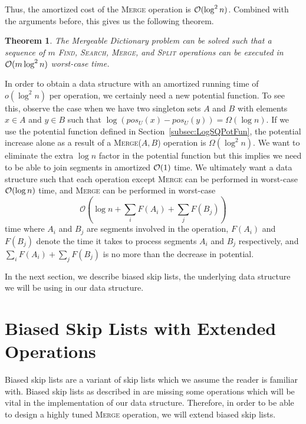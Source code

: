 \documentclass[11pt]{article}
\newcommand{\prob}{Mergeable Dictionary}
\newcommand{\kwMs}{Make-Set}
\newcommand{\kwSpl}{Split}
\newcommand{\kwUnion}{Merge}
\newcommand{\kwSrc}{Search}
\newcommand{\kwFind}{Find}
\newcommand{\Ms}{\mbox{\textsc{\kwMs}}}
\newcommand{\Spl}{\mbox{\textsc{\kwSpl}}}
\newcommand{\Union}{\mbox{\textsc{\kwUnion{}}}}
\newcommand{\Unionx}[2]{\mbox{\textsc{\kwUnion(\ensuremath{#1,#2})}}}
\newcommand{\Src}{\mbox{\textsc{\kwSrc}}}
\newcommand{\Find}{\mbox{\textsc{\kwFind}}}
\newcommand{\segments}{{\segment}s}
\newcommand{\segment}{segment}
\newcommand{\intl}[1]{\ensuremath{#1}}
\newcommand{\node}[1]{\ensuremath{#1}}
\newcommand{\nodeposition}[2]{pos\ensuremath{_{\set #1}(\node #2)}}
\newcommand{\set}[1]{\ensuremath{#1}}
\newcommand{\intfun}[1]{\ensuremath{F(\intl #1)}}
\newcommand{\hide}[1]{}
\newcounter{count}
\newtheorem{thm}[count]{Theorem}
\begin{document}
Thus, the amortized cost of the \Union{} operation is ${\cal O}(\log^2 n)$. Combined with the arguments before, this gives us the following theorem. 
 



\begin{thm} 
\label{thm:logsq} 
The \prob{} problem can be solved such that a sequence of $m$ \hide{\Ms{}, }\Find{}, \Src{}, \Union{}, and \Spl{} operations\hide{, $n$ of which are \Ms{} operations, } can be executed in ${\cal O}(m\log^2 n)$  worst-case time. 
\end{thm} 



In order to obtain a data structure with an amortized running time of $o(\log^2 n)$ per operation, we certainly need a new potential function. 
To see this, observe the case when we have two singleton sets $\set A$ and $\set B$ with elements $\node x\in \set A$ and $\node y\in \set B$ such that $\log(\nodeposition{U}{x} - \nodeposition{U}{y}) = \Omega(\log n)$. If we use the potential function defined in Section~\ref{subsec:LogSQPotFun}, the potential increase alone as a result of a \Unionx{A}{B} operation is $\Omega(\log^2 n)$. We want to eliminate the extra $\log n$ factor in the potential function but this implies we need to be able to join \segments{} in amortized ${\cal O}(1)$ time. We ultimately want a data structure such that each operation except \Union{} can be performed in worst-case ${\cal O}(\log n)$ time, and \Union{} can be performed in worst-case 
\[ 
\mathcal O\left(\log n + \sum_i \intfun{A_i} + \sum_j \intfun{B_j} \right) 
\] 
time where $\intl A_i$ and $\intl B_j$ are \segments{} involved in the operation, \intfun{A_i} and \intfun{B_j} denote the time it takes to process \segments{} $\intl A_i$  and $\intl B_j$ respectively, and $\sum_i \intfun{A_i}+ \sum_j \intfun{B_j}$ is no more than the decrease in potential. 



In the next section, we describe biased skip lists, the underlying data structure we will be using in our data structure. 


\section{Biased Skip Lists with Extended Operations} 
\label{sec:BSL} 
Biased skip lists are a variant of skip lists \cite{journals/cacm/Pugh90} which we assume the reader is familiar with. Biased skip lists as described in \cite{journals/algorithmica/BagchiBG05} are missing some operations which will be vital in the implementation of our data structure. Therefore, in order to be able to design a highly tuned \Union{} operation, we will extend biased skip lists. 
\end{document}

